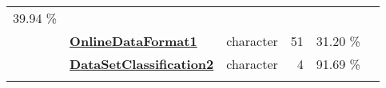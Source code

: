 \documentclass[]{article}
\begin{document}
\begin{longtable}[]{@{}lllrcl@{}}
\begin{minipage}[t]{0.10\columnwidth}
39.94 \%\strut
\end{minipage} & \begin{minipage}[t]{0.12\columnwidth}\raggedright\strut
\strut
\end{minipage}\tabularnewline
\begin{minipage}[t]{0.07\columnwidth}\raggedright\strut
\strut
\end{minipage} & \begin{minipage}[t]{0.35\columnwidth}\raggedright\strut
\textbf{\protect\hyperlink{onlinedataformat1}{OnlineDataFormat1}}\strut
\end{minipage} & \begin{minipage}[t]{0.11\columnwidth}\raggedright\strut
character\strut
\end{minipage} & \begin{minipage}[t]{0.10\columnwidth}\raggedleft\strut
51\strut
\end{minipage} & \begin{minipage}[t]{0.10\columnwidth}\centering\strut
31.20 \%\strut
\end{minipage} & \begin{minipage}[t]{0.12\columnwidth}\raggedright\strut
\strut
\end{minipage}\tabularnewline
\begin{minipage}[t]{0.07\columnwidth}\raggedright\strut
\strut
\end{minipage} & \begin{minipage}[t]{0.35\columnwidth}\raggedright\strut
\textbf{\protect\hyperlink{datasetclassification2}{DataSetClassification2}}\strut
\end{minipage} & \begin{minipage}[t]{0.11\columnwidth}\raggedright\strut
character\strut
\end{minipage} & \begin{minipage}[t]{0.10\columnwidth}\raggedleft\strut
4\strut
\end{minipage} & \begin{minipage}[t]{0.10\columnwidth}\centering\strut
91.69 \%\strut
\end{minipage} & \begin{minipage}[t]{0.12\columnwidth}\raggedright\strut
\strut
\end{minipage}\tabularnewline
\begin{minipage}[t]{0.07\columnwidth}\raggedright\strut
\strut
\end{minipage} & \begin{minipage}[t]{0.35\columnwidth}\raggedright\strut

\end{minipage}
\end{longtable}
\end{document}
